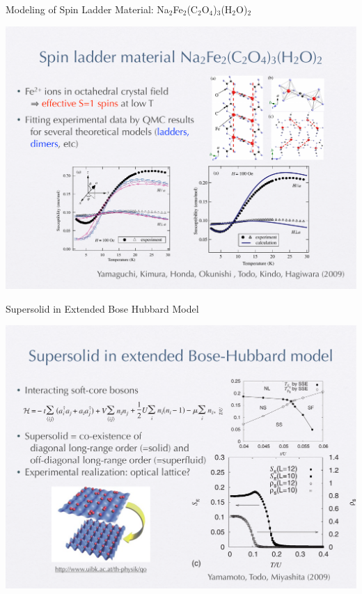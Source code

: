 \begin{frame}[t,fragile]{Modeling of Spin Ladder Material: Na$_2$Fe$_2$(C$_2$O$_4$)$_3$(H$_2$O)$_2$}
  \begin{center}
    \includegraphics[height=.8\textheight]{ladder.pdf}
  \end{center}
\end{frame}

\begin{frame}[t,fragile]{Supersolid in Extended Bose Hubbard Model}
  \begin{center}
    \includegraphics[height=.8\textheight]{supersolid.pdf}
  \end{center}
\end{frame}

